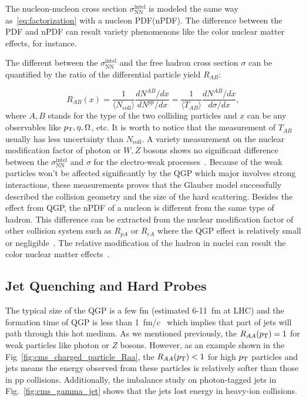 The nucleon-nucleon cross section $\sigma_{\text{NN}}^{\text{intel}}$ is modeled the same way as~\ref{eq:factorization} with a nucleon PDF(nPDF). The difference between the PDF and nPDF can result variety phenomenons like the color nuclear matter effects, for instance. 

The different between the $\sigma_{\text{NN}}^{\text{intel}}$ and the free hadron cross section $\sigma$ can be quantified by the ratio of the differential particle yield $R_{AB}$:

\begin{equation}
  R_{AB}(x)=\frac{1}{\langle N_{\text{coll}}\rangle}\frac{dN^{AB}/dx}{dN^{pp}/dx} = \frac{1}{\langle T_{AB}\rangle}\frac{dN^{AB}/dx}{ d\sigma/dx},
\end{equation}
where $A,B$ stands for the type of the two colliding particles and $x$ can be any observables like $p_{\text{T}}, \eta, \Omega$, etc. It is worth to notice that the measurement of $T_{AB}$ usually has less uncertainty than $N_{\text{coll}}$. A variety measurement on the nuclear modification factor of photon or $W,Z$ bosons shows no significant difference between the $\sigma_{\text{NN}}^{\text{intel}}$ and $\sigma$ for the electro-weak processes~\cite{Sirunyan:2020ycu,Aad:2019lan,Aad:2019sfe}. Because of the weak particles won't be affected significantly by the QGP which major involves strong interactions, these measurements proves that the Glauber model successfully described the collision geometry and the size of the hard scattering. Besides the effect from QGP, the nPDF of a nucleon is different from the same type of hadron. This difference can be extracted from the nuclear modification factor of other collision system such as $R_{pA}$ or $R_{eA}$ where the QGP effect is relatively small or negligible~\cite{Kusina:2015vfa}. The relative modification of the hadron in nuclei can result the color nuclear matter effects~\cite{Arneodo:1992wf}.

\subsection{Jet Quenching and Hard Probes}
The typical size of the QGP is a few fm (estimated 6-11~fm at LHC) and the formation time of QGP is less than 1~fm/$c$~\cite{Liu:2012ax} which implies that part of jets will path through this hot medium. As we mentioned previously, the $R_{AA}(p_{\text{T}})=1$ for weak particles like photon or $Z$ bosons. However, as an example shown in the Fig~\ref{fig:cms_charged_particle_Raa}, the $R_{AA}(p_{\text{T}})<1$ for high $p_{\text{T}}$ particles and jets means the energy observed from these particles is relatively softer than those in pp collisions. Additionally, the imbalance study on photon-tagged jets in Fig.~\ref{fig:cms_gamma_jet} shows that the jets lost energy in heavy-ion collisions.

